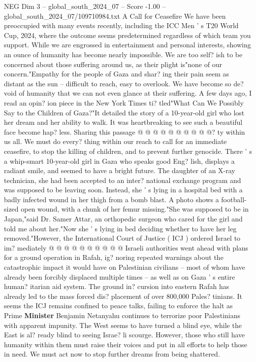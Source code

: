 \begin{textsample}{NEG Dim 3 – global\_south\_2024\_07 – Score -1.00 – global\_south\_2024\_07/109710984.txt}  \label{ex:f3_neg_146}
A Call for Ceasefire We have been preoccupied with many events recently, including the ICC Men ' s T20 World Cup, 2024, where the outcome seems predetermined regardless of which team you support.
While we are engrossed in entertainment and personal interests, showing an ounce of humanity has become nearly impossible.
We are too self? ish to be concerned about those suffering around us, as their plight is"none of our concern."Empathy for the people of Gaza and shar? ing their pain seem as distant as the sun -- difficult to reach, easy to overlook.
We have become so de? void of humanity that we can not even glance at their suffering.
A few days ago, I read an opin? ion piece in the New York Times ti? tled"What Can We Possibly Say to the Children of Gaza?"It detailed the story of a 10-year-old girl who lost her dream and her ability to walk.
It was heartbreaking to see such a beautiful face become hap? less.
Sharing this passage @ @ @ @ @ @ @ @ @ @? ty within us all.
We must do every? thing within our reach to call for an immediate ceasefire, to stop the killing of children, and to prevent further genocide.
There ' s a whip-smart 10-year-old girl in Gaza who speaks good Eng? lish, displays a radiant smile, and seemed to have a bright future.
The daughter of an X-ray technician, she had been accepted to an inter? national exchange program and was supposed to be leaving soon.
Instead, she ' s lying in a hospital bed with a badly infected wound in her thigh from a bomb blast.
A photo shows a football-sized open wound, with a chunk of her femur missing."She was supposed to be in Japan,"said Dr.
Samer Attar, an orthopedic surgeon who cared for the girl and told me about her."Now she ' s lying in bed deciding whether to have her leg removed."However, the International Court of Justice ( ICJ ) ordered Israel to im? mediately @ @ @ @ @ @ @ @ @ @ Israeli authorities went ahead with plans for a ground operation in Rafah, ig? noring repeated warnings about the catastrophic impact it would have on Palestinian civilians -- most of whom have already been forcibly displaced multiple times -- as well as on Gaza ' s entire human? itarian aid system.
The ground in? cursion into eastern Rafah has already led to the mass forced dis? placement of over 800,000 Pales? tinians.
It seems the ICJ remains confined to peace talks, failing to enforce the halt as Prime \textbf{Minister} Benjamin Netanyahu continues to terrorize poor Palestinians with apparent impunity.
The West seems to have turned a blind eye, while the East is al? ready blind to seeing Israe? li scourge.
However, those who still have humanity within them must raise their voices and put in all efforts to help those in need.
We must act now to stop further dreams from being shattered.

\end{textsample}
